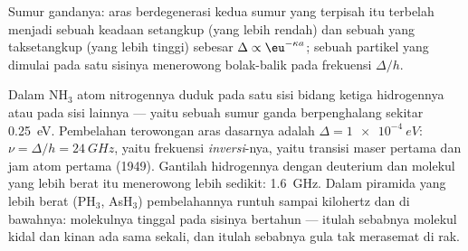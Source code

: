 \begin{omfigure}

{\small Sumur gandanya: aras berdegenerasi kedua sumur yang terpisah
itu terbelah menjadi sebuah keadaan setangkup (yang lebih rendah) dan sebuah yang taksetangkup
(yang lebih tinggi) sebesar $\Delta \propto \eu^{-\kappa a}$; sebuah partikel yang dimulai pada satu sisinya
menerowong bolak-balik pada frekuensi $\Delta/h$.}
\end{omfigure}

\begin{example}[Amonia]\label{ex:b2:potential-wells-tunneling:ammonia}
Dalam NH$_3$ atom nitrogennya duduk pada satu sisi bidang ketiga
hidrogennya atau pada sisi lainnya --- yaitu sebuah sumur ganda berpenghalang sekitar
\qty{0.25}{eV}. Pembelahan terowongan aras dasarnya adalah $\Delta =
\qty{1e-4}{eV}$: $\nu = \Delta/h = \qty{24}{GHz}$, yaitu frekuensi
\emph{inversi}-nya, yaitu transisi maser pertama dan jam atom
pertama (1949). Gantilah hidrogennya dengan deuterium dan molekul yang lebih berat itu
menerowong lebih sedikit: \qty{1.6}{GHz}. Dalam piramida yang lebih berat (PH$_3$, AsH$_3$)
pembelahannya runtuh sampai kilohertz dan di bawahnya: molekulnya tinggal pada
sisinya bertahun --- itulah sebabnya molekul kidal dan kinan ada
sama sekali, dan itulah sebabnya gula tak merasemat di rak.
\end{example}

